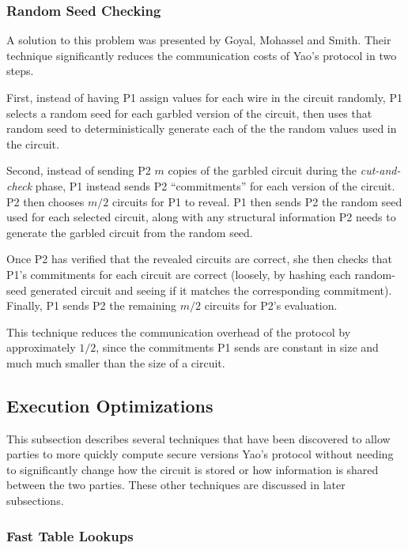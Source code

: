 \subsubsection{Random Seed Checking}
\label{sec:randomseed}

A solution to this problem was presented by Goyal, Mohassel and Smith\cite{goyal2008efficient}. Their technique significantly reduces the communication costs of Yao's protocol in two steps.

First, instead of having \ac{P1} assign values for each wire in the circuit randomly, \ac{P1} selects a random seed for each garbled version of the circuit, then uses that random seed to deterministically generate each of the the random values used in the circuit.

Second, instead of sending \ac{P2} $m$ copies of the garbled circuit during the \emph{cut-and-check} phase, \ac{P1} instead sends \ac{P2} ``commitments'' for each version of the circuit.  \ac{P2} then chooses $m/2$ circuits for \ac{P1} to reveal.  \ac{P1} then sends \ac{P2} the random seed used for each selected circuit, along with any structural information \ac{P2} needs to generate the garbled circuit from the random seed.

Once \ac{P2} has verified that the revealed circuits are correct, she then checks that \ac{P1}'s commitments for each circuit are correct (loosely, by hashing each random-seed generated circuit and seeing if it matches the corresponding commitment).  Finally, \ac{P1} sends \ac{P2} the remaining $m/2$ circuits for \ac{P2}'s evaluation.

This technique reduces the communication overhead of the protocol by approximately $1/2$, since the commitments \ac{P1} sends are constant in size and much much smaller than the size of a circuit.


\subsection{Execution Optimizations}

This subsection describes several techniques that have been discovered to allow parties to more quickly compute secure versions Yao's protocol without needing to significantly change how the circuit is stored or how information is shared between the two parties.  These other techniques are discussed in later subsections.

\subsubsection{Fast Table Lookups}

